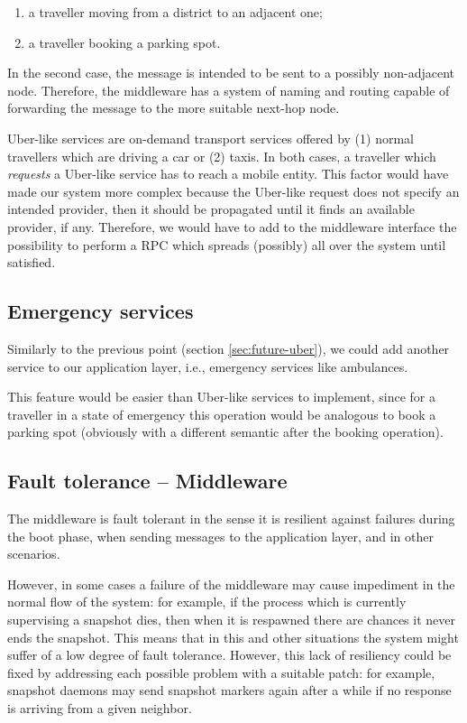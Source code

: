 \begin{enumerate}
  \item a traveller moving from a district to an adjacent one;
  \item a traveller booking a parking spot.
\end{enumerate}

In the second case, the message is intended to be sent to a possibly
non-adjacent node. Therefore, the middleware has a system of naming and routing
capable of forwarding the message to the more suitable next-hop node.

Uber-like services are on-demand transport services offered by (1) normal
travellers which are driving a car or (2) taxis. In both cases, a traveller
which \textit{requests} a Uber-like service has to reach a mobile entity.
This factor would have made our system more complex because the Uber-like
request does not specify an intended provider, then it should be propagated
until it finds an available provider, if any.
Therefore, we would have to add to the middleware interface the possibility to
perform a RPC which spreads (possibly) all over the system until satisfied.

\subsection{Emergency services}
Similarly to the previous point (section \ref{sec:future-uber}), we could add
another service to our application layer, i.e., emergency services like
ambulances.

This feature would be easier than Uber-like services to implement, since for a
traveller in a state of emergency this operation would be analogous to book a
parking spot (obviously with a different semantic after the booking operation).

\subsection{Fault tolerance -- Middleware}
The middleware is fault tolerant in the sense it is resilient against failures
during the boot phase, when sending messages to the application layer, and in
other scenarios.

However, in some cases a failure of the middleware may cause impediment in the
normal flow of the system: for example, if the process which is currently
supervising a snapshot dies, then when it is respawned there are chances it
never ends the snapshot.
This means that in this and other situations the system might suffer of a low
degree of fault tolerance. However, this lack of resiliency could be fixed by
addressing each possible problem with a suitable patch: for example, snapshot
daemons may send snapshot markers again after a while if no response is
arriving from a given neighbor.

